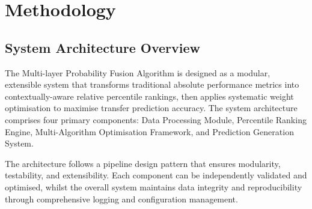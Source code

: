 \section{Methodology}

\subsection{System Architecture Overview}

The Multi-layer Probability Fusion Algorithm is designed as a modular, extensible system that transforms traditional absolute performance metrics into contextually-aware relative percentile rankings, then applies systematic weight optimisation to maximise transfer prediction accuracy. The system architecture comprises four primary components: Data Processing Module, Percentile Ranking Engine, Multi-Algorithm Optimisation Framework, and Prediction Generation System.

The architecture follows a pipeline design pattern that ensures modularity, testability, and extensibility. Each component can be independently validated and optimised, whilst the overall system maintains data integrity and reproducibility through comprehensive logging and configuration management.

